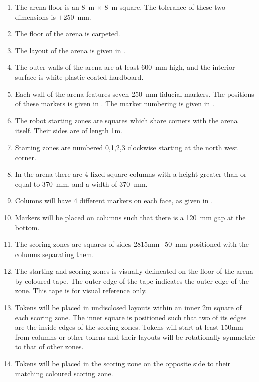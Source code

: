 \begin{enumerate}
  \item The arena floor is an \SI{8}{m} $\times$ \SI{8}{m} square. The tolerance
        of these two dimensions is $\pm$\SI{250}{mm}.
  \item The floor of the arena is carpeted.
  \item The layout of the arena is given in .
  \item The outer walls of the arena are at least \SI{600}{mm} high, and the
        interior surface is white plastic-coated hardboard.
  \item Each wall of the arena features seven \SI{250}{mm} fiducial markers.
        The positions of these markers is given in .
        The marker numbering is given in .
  \item The robot starting zones are squares which share corners with the arena
        itself. Their sides are of length \si{1}{m}.
  \item Starting zones are numbered 0,1,2,3 clockwise starting at the north west corner.
  \item In the arena there are 4 fixed square columns with a height greater than
        or equal to \SI{370}{mm}, and a width of \SI{370}{mm}.
  \item Columns will have 4 different markers on each face, as given in
        .
  \item Markers will be placed on columns such that there is a \SI{120}{mm} 
        gap at the bottom.
  \item The scoring zones are squares of sides \si{2815}{mm}$\pm$\SI{50}{mm} positioned with the
        columns separating them.
  \item The starting and scoring zones is visually delineated on the floor of
        the arena by coloured tape. The outer edge of the tape indicates the
        outer edge of the zone. This tape is for visual reference only.
  \item \label{spec:tokenpos} Tokens will be placed in undisclosed layouts
        within an inner \si{2}{m} square of each scoring zone. The inner square
        is positioned such that two of its edges are the inside edges of the
        scoring zones. Tokens will start at least \si{150}{mm} from columns
        or other tokens and their layouts will be rotationally symmetric to
        that of other zones.
  \item Tokens will be placed in the scoring zone on the opposite side to their
        matching coloured scoring zone.
\end{enumerate}

